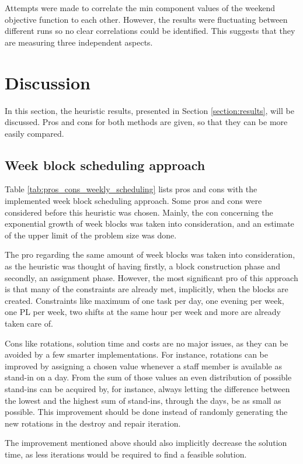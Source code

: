 Attempts were made to correlate the min component values of the weekend objective function to each other. However, the results were fluctuating between different runs so no clear correlations could be identified. This suggests that they are measuring three independent aspects.

\section{Discussion}
In this section, the heuristic results, presented in Section \ref{section:results}, will be discussed. Pros and cons for both methods are given, so that they can be more easily compared.


\subsection{Week block scheduling approach}
Table \ref{tab:pros_cons_weekly_scheduling} lists pros and cons with the implemented week block scheduling approach. Some pros and cons were considered before this heuristic was chosen. Mainly, the con concerning the exponential growth of week blocks was taken into consideration, and an estimate of the upper limit of the problem size was done.

The pro regarding the same amount of week blocks was taken into consideration, as the heuristic was thought of having firstly, a block construction phase and secondly, an assignment phase. However, the most significant pro of this approach is that many of the constraints are already met, implicitly, when the blocks are created. Constraints like maximum of one task per day, one evening per week, one PL per week, two shifts at the same hour per week and more are already taken care of. 

Cons like rotations, solution time and costs are no major issues, as they can be avoided by a few smarter implementations. For instance, rotations can be improved by assigning a chosen value whenever a staff member is available as stand-in on a day. From the sum of those values an even distribution of possible stand-ins can be acquired by, for instance, always letting the difference between the lowest and the highest sum of stand-ins, through the days, be as small as possible. This improvement should be done instead of randomly generating the new rotations in the destroy and repair iteration. 

The improvement mentioned above should also implicitly decrease the solution time, as less iterations would be required to find a feasible solution.

